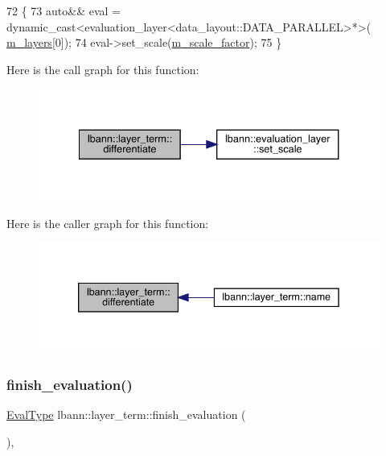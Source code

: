 \begin{DoxyCode}
72                                \{
73   \textcolor{keyword}{auto}&& eval = \textcolor{keyword}{dynamic\_cast<}evaluation\_layer<data\_layout::DATA\_PARALLEL>*\textcolor{keyword}{>}(
      \hyperlink{classlbann_1_1objective__function__term_a9269cf0a237eacd1e220ba2739f44334}{m\_layers}[0]);
74   eval->set\_scale(\hyperlink{classlbann_1_1objective__function__term_a59a544b8ff0455ed5091de3bf0d81c3c}{m\_scale\_factor});
75 \}
\end{DoxyCode}
Here is the call graph for this function\+:\nopagebreak
\begin{figure}[H]
\begin{center}
\leavevmode
\includegraphics[width=334pt]{classlbann_1_1layer__term_a857df1636853ea9b805611c55ff791e3_cgraph}
\end{center}
\end{figure}
Here is the caller graph for this function\+:\nopagebreak
\begin{figure}[H]
\begin{center}
\leavevmode
\includegraphics[width=339pt]{classlbann_1_1layer__term_a857df1636853ea9b805611c55ff791e3_icgraph}
\end{center}
\end{figure}
\mbox{\label{classlbann_1_1layer__term_a2b0fdcf6a0dd7bea797b5ef1b4082f70}} 
\subsubsection{\texorpdfstring{finish\+\_\+evaluation()}{finish\_evaluation()}}
{\footnotesize\ttfamily \hyperlink{base_8hpp_a3266f5ac18504bbadea983c109566867}{Eval\+Type} lbann\+::layer\+\_\+term\+::finish\+\_\+evaluation (\begin{DoxyParamCaption}{ }\end{DoxyParamCaption})\hspace{0.3cm}{\ttfamily [override]}, {\ttfamily [virtual]}}

